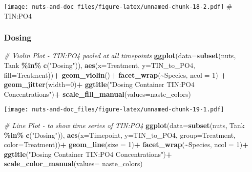\documentclass[
]{article}
\newenvironment{Shaded}{\begin{snugshade}}{\end{snugshade}}
\newcommand{\AttributeTok}[1]{\textcolor[rgb]{0.13,0.29,0.53}{#1}}
\newcommand{\CommentTok}[1]{\textcolor[rgb]{0.56,0.35,0.01}{\textit{#1}}}
\newcommand{\DecValTok}[1]{\textcolor[rgb]{0.00,0.00,0.81}{#1}}
\newcommand{\FunctionTok}[1]{\textcolor[rgb]{0.13,0.29,0.53}{\textbf{#1}}}
\newcommand{\NormalTok}[1]{#1}
\newcommand{\SpecialCharTok}[1]{\textcolor[rgb]{0.81,0.36,0.00}{\textbf{#1}}}
\newcommand{\StringTok}[1]{\textcolor[rgb]{0.31,0.60,0.02}{#1}}
\begin{document}
\texttt{[image: nuts-and-doc\_files/figure-latex/unnamed-chunk-18-2.pdf]}
\# TIN:PO4

\hypertarget{dosing-7}{%
\subsubsection{Dosing}\label{dosing-7}}

\begin{Shaded}
\begin{Highlighting}[]
\CommentTok{\# Violin Plot {-} TIN:PO4 pooled at all timepoints}
\FunctionTok{ggplot}\NormalTok{(}\AttributeTok{data=}\FunctionTok{subset}\NormalTok{(nuts, Tank }\SpecialCharTok{\%in\%} \FunctionTok{c}\NormalTok{(}\StringTok{"Dosing"}\NormalTok{)), }\FunctionTok{aes}\NormalTok{(}\AttributeTok{x=}\NormalTok{Treatment, }\AttributeTok{y=}\NormalTok{TIN\_to\_PO4, }\AttributeTok{fill=}\NormalTok{Treatment))}\SpecialCharTok{+}
  \FunctionTok{geom\_violin}\NormalTok{()}\SpecialCharTok{+}
  \FunctionTok{facet\_wrap}\NormalTok{(}\SpecialCharTok{\textasciitilde{}}\NormalTok{Species, }\AttributeTok{ncol =} \DecValTok{1}\NormalTok{) }\SpecialCharTok{+}
  \FunctionTok{geom\_jitter}\NormalTok{(}\AttributeTok{width=}\DecValTok{0}\NormalTok{)}\SpecialCharTok{+}
  \FunctionTok{ggtitle}\NormalTok{(}\StringTok{"Dosing Container TIN:PO4 Concentrations"}\NormalTok{)}\SpecialCharTok{+}
  \FunctionTok{scale\_fill\_manual}\NormalTok{(}\AttributeTok{values=}\NormalTok{naste\_colors)}
\end{Highlighting}
\end{Shaded}

\texttt{[image: nuts-and-doc\_files/figure-latex/unnamed-chunk-19-1.pdf]}

\begin{Shaded}
\begin{Highlighting}[]
\CommentTok{\# Line Plot {-} to show time series of TIN:PO4}
\FunctionTok{ggplot}\NormalTok{(}\AttributeTok{data=}\FunctionTok{subset}\NormalTok{(nuts, Tank }\SpecialCharTok{\%in\%} \FunctionTok{c}\NormalTok{(}\StringTok{"Dosing"}\NormalTok{)), }\FunctionTok{aes}\NormalTok{(}\AttributeTok{x=}\NormalTok{Timepoint, }\AttributeTok{y=}\NormalTok{TIN\_to\_PO4, }\AttributeTok{group=}\NormalTok{Treatment, }\AttributeTok{color=}\NormalTok{Treatment))}\SpecialCharTok{+}
  \FunctionTok{geom\_line}\NormalTok{(}\AttributeTok{size =} \DecValTok{1}\NormalTok{)}\SpecialCharTok{+}
  \FunctionTok{facet\_wrap}\NormalTok{(}\SpecialCharTok{\textasciitilde{}}\NormalTok{Species, }\AttributeTok{ncol =} \DecValTok{1}\NormalTok{)}\SpecialCharTok{+}
  \FunctionTok{ggtitle}\NormalTok{(}\StringTok{"Dosing Container TIN:PO4 Concentrations"}\NormalTok{)}\SpecialCharTok{+}
  \FunctionTok{scale\_color\_manual}\NormalTok{(}\AttributeTok{values=}\NormalTok{ naste\_colors)}
\end{Highlighting}
\end{Shaded}
\end{document}
